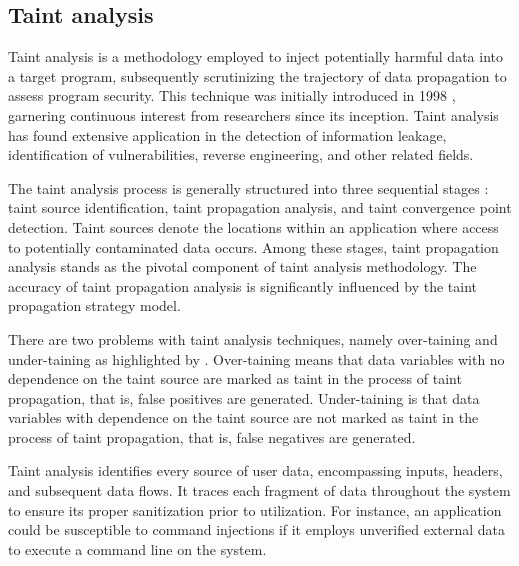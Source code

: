 

\subsection{Taint analysis} %
\label{sec: Taint_analysis}

Taint analysis is a methodology employed to inject potentially harmful data into a target program, subsequently scrutinizing the trajectory of data propagation to assess program security. This technique was initially introduced in 1998 \cite{Ren_2020}, garnering continuous interest from researchers since its inception. Taint analysis has found extensive application in the detection of information leakage, identification of vulnerabilities, reverse engineering, and other related fields.

The taint analysis process is generally structured into three sequential stages \cite{REN_Yuzhu2019}: taint source identification, taint propagation analysis, and taint convergence point detection. Taint sources denote the locations within an application where access to potentially contaminated data occurs. Among these stages, taint propagation analysis stands as the pivotal component of taint analysis methodology. The accuracy of taint propagation analysis is significantly influenced by the taint propagation strategy model.

There are two problems with taint analysis techniques, namely over-taining and under-taining as highlighted by \cite{REN_Yuzhu2019}. Over-taining means that data variables with no dependence on the taint source are marked as taint in the process of taint propagation, that is, false positives are generated. Under-taining is that data variables with dependence on the taint source are not marked as taint in the process of taint propagation, that is, false negatives are generated.

Taint analysis identifies every source of user data, encompassing inputs, headers, and subsequent data flows. It traces each fragment of data throughout the system to ensure its proper sanitization prior to utilization. For instance, an application could be susceptible to command injections if it employs unverified external data to execute a command line on the system.




